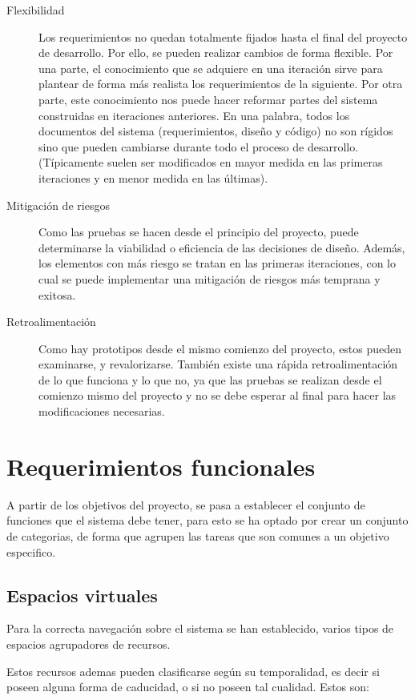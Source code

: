 \begin{description}
\item [Flexibilidad] Los requerimientos no quedan totalmente fijados hasta el
final del proyecto de desarrollo. Por ello, se pueden realizar cambios de forma
flexible. Por una parte, el conocimiento que se adquiere en una iteración sirve
para plantear de forma más realista los requerimientos de la siguiente. Por
otra parte, este conocimiento nos puede hacer reformar partes del sistema
construidas en iteraciones anteriores. En una palabra, todos los documentos del
sistema (requerimientos, diseño y código) no son rígidos sino que pueden
cambiarse durante todo el proceso de desarrollo. (Típicamente suelen ser
modificados en mayor medida en las primeras iteraciones y en menor medida en
las últimas).
\item [Mitigación de riesgos] Como las pruebas se hacen desde el principio del
proyecto, puede determinarse la viabilidad o eficiencia de las decisiones de
diseño. Además, los elementos con más riesgo se tratan en las primeras
iteraciones, con lo cual se puede implementar una mitigación de riesgos más 
temprana y exitosa.
\item [Retroalimentación] Como hay prototipos desde el mismo comienzo del
proyecto, estos pueden examinarse, y revalorizarse. También existe una rápida
retroalimentación de lo que funciona y lo que no, ya que las pruebas se 
realizan desde el comienzo mismo del proyecto y no se debe esperar al final
para hacer las modificaciones necesarias.
\end{description}

\section{Requerimientos funcionales}

A partir de los objetivos del proyecto, se pasa a establecer el conjunto de
funciones que el sistema debe tener, para esto se ha optado por crear un
conjunto de categorias, de forma que agrupen las tareas que son comunes a un
objetivo especifico.

\subsection{Espacios virtuales}

Para la correcta navegación sobre el sistema se han establecido, varios tipos de
espacios agrupadores de recursos.

Estos recursos ademas pueden clasificarse según su temporalidad, es decir si
poseen alguna forma de caducidad, o si no poseen tal cualidad. Estos son:

